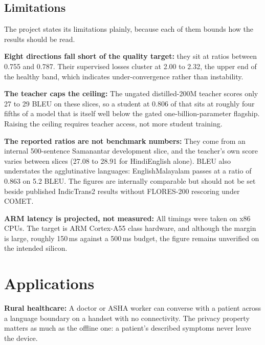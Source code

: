 \subsection{Limitations}
\label{sec:limits}

The project states its limitations plainly, because each of them bounds how
the results should be read.

\begin{bullets}
\item \textbf{Eight directions fall short of the quality target:} they sit at
ratios between 0.755 and 0.787. Their supervised losses cluster at 2.00 to 2.32, the
upper end of the healthy band, which indicates under-convergence rather than
instability.

\item \textbf{The teacher caps the ceiling:} The ungated distilled-200M teacher
scores only 27 to 29 BLEU on these slices, so a student at 0.806 of that sits
at roughly four fifths of a model that is itself well below the gated
one-billion-parameter flagship. Raising the ceiling requires teacher access,
not more student training.

\item \textbf{The reported ratios are not benchmark numbers:} They come from an
internal 500-sentence Samanantar development slice, and the teacher's own score
varies between slices (27.08 to 28.91 for Hindi\arrowto{}English alone). BLEU
also understates the agglutinative languages: English\arrowto{}Malayalam passes
at a ratio of 0.863 on 5.2 BLEU. The figures are internally comparable but
should not be set beside published IndicTrans2 results without FLORES-200
rescoring under COMET.

\item \textbf{ARM latency is projected, not measured:} All timings were taken
on x86 CPUs. The target is ARM Cortex-A55 class hardware, and although the
margin is large, roughly 150\,ms against a 500\,ms budget, the figure remains
unverified on the intended silicon.
\end{bullets}

\section{Applications}
\label{sec:applications}

\textbf{Rural healthcare:} A doctor or ASHA worker can converse with a patient
across a language boundary on a handset with no connectivity. The privacy
property matters as much as the offline one: a patient's described symptoms
never leave the device.

